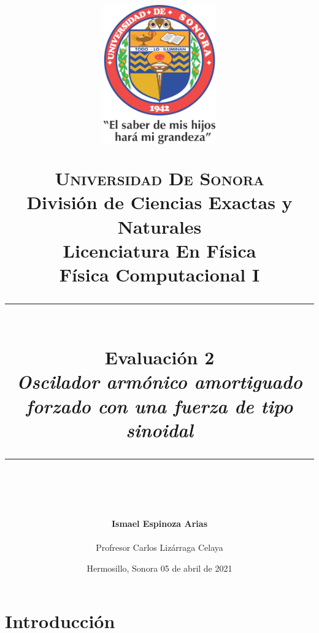 \documentclass[12pt]{article}
\newcommand{\HRule}[1]{\rule{\linewidth}{#1}}
\begin{document}
\begin{titlepage}

\title{ \normalsize 
        \begin{center}
        \includegraphics[height=6cm]{Logo.jpg}
        \end{center}
        \LARGE \textsc{\textbf{Universidad De Sonora}} \\ \bigskip
		\Large División de Ciencias Exactas y Naturales \\
        Licenciatura En Física \\ \bigskip
        \bigskip
        Física Computacional I
		\\ [0.1cm]  
		\HRule{2pt} \\
		\Large \textbf{{Evaluación 2}} \\
        \textit{\textbf{ Oscilador armónico amortiguado forzado con una fuerza de tipo sinoidal}}
		\HRule{2pt} \\
		\normalsize \vspace*{0.001\baselineskip}}
        
\date{\bigskip \Large Hermosillo, Sonora  \hspace*{\fill}  05 de abril de 2021}

        
\author{
		\Large\textbf{Ismael Espinoza Arias} \\ \bigskip
        \\ \bigskip
       \Large Profresor Carlos Lizárraga Celaya}
       \end{titlepage}
       \maketitle
       
\newpage
\pagestyle{plain}


\section{Introducción}
\end{document}
